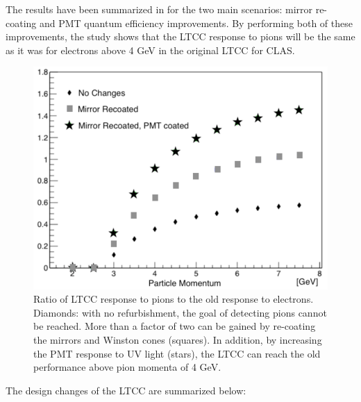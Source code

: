 The results have been summarized in  for the two main scenarios: mirror re-coating and PMT quantum efficiency improvements.
By performing both of these improvements, the study shows that the LTCC response to pions will be the same as it was for electrons above 4 GeV
in the original LTCC for CLAS.

\begin{figure}
	\centering
	\includegraphics[width=0.99\columnwidth, height=0.7\columnwidth]{img/refurbishmentGains.png}
	\caption{Ratio of LTCC response to pions to the old response to electrons. Diamonds: with no refurbishment, the goal of
		     detecting pions cannot be reached. More than a factor of two can be gained by re-coating the mirrors and Winston cones
             (squares). In addition, by increasing the PMT response to UV light (stars), the LTCC can reach the old
			 performance above pion momenta of 4 GeV.}
	\label{fig:refurbishmentGains}
\end{figure}

The design changes of the LTCC are summarized below:

